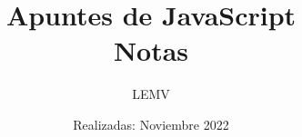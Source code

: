 \documentclass{article}
\title{Apuntes de JavaScript\\
\Large{Notas}}
\author{LEMV}
\date{Realizadas: Noviembre 2022}
\begin{document}
\renewcommand*\contentsname{Índice}
\renewcommand{\listtablename}{Índice de Tablas}
\renewcommand{\listfigurename}{Índice de Figuras}

\maketitle\newpage
\tableofcontents\newpage
\listoffigures\newpage
\listoftables\newpage








\end{document}
